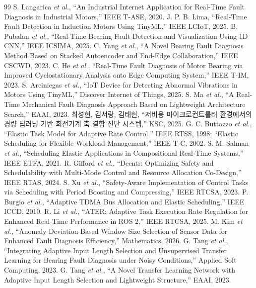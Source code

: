 \documentclass[10pt]{article}
\begin{document}
\begin{thebibliography}{99}\footnotesize
{} S. Langarica \emph{et al.}, ``An Industrial Internet Application for Real-Time Fault Diagnosis in Industrial Motors,'' IEEE T-ASE, 2020.
 J. P. B. Lima, ``Real-Time Fault Detection in Induction Motors Using TinyML,'' IEEE LCIoT, 2025.
 B. Pubalan \emph{et al.}, ``Real-Time Bearing Fault Detection and Visualization Using 1D CNN,'' IEEE ICSIMA, 2025.
 C. Yang \emph{et al.}, ``A Novel Bearing Fault Diagnosis Method Based on Stacked Autoencoder and End-Edge Collaboration,'' IEEE CSCWD, 2023.
 C. He \emph{et al.}, ``Real-Time Fault Diagnosis of Motor Bearing via Improved Cyclostationary Analysis onto Edge Computing System,'' IEEE T-IM, 2023.
 S. Arciniegas \emph{et al.}, ``IoT Device for Detecting Abnormal Vibrations in Motors Using TinyML,'' Discover Internet of Things, 2025.
 S. Ma \emph{et al.}, ``A Real-Time Mechanical Fault Diagnosis Approach Based on Lightweight Architecture Search,'' EAAI, 2023.
 최성현, 김서랑, 김태현, ``저비용 마이크로컨트롤러 환경에서의 경량 딥러닝 기반 회전기계 축 결함 진단 시스템,'' KSC, 2025.
 G. C. Buttazzo \emph{et al.}, ``Elastic Task Model for Adaptive Rate Control,'' IEEE RTSS, 1998; ``Elastic Scheduling for Flexible Workload Management,'' IEEE T-C, 2002.
 S. M. Salman \emph{et al.}, ``Scheduling Elastic Applications in Compositional Real-Time Systems,'' IEEE ETFA, 2021.
 R. Gifford \emph{et al.}, ``Decntr: Optimizing Safety and Schedulability with Multi-Mode Control and Resource Allocation Co-Design,'' IEEE RTAS, 2024.
 S. Xu \emph{et al.}, ``Safety-Aware Implementation of Control Tasks via Scheduling with Period Boosting and Compressing,'' IEEE RTCSA, 2023.
 P. Burgio \emph{et al.}, ``Adaptive TDMA Bus Allocation and Elastic Scheduling,'' IEEE ICCD, 2010.
 R. Li \emph{et al.}, ``ATER: Adaptive Task Execution Rate Regulation for Enhanced Real-Time Performance in ROS 2,'' IEEE RTCSA, 2025.
 M. Kim \emph{et al.}, ``Anomaly Deviation-Based Window Size Selection of Sensor Data for Enhanced Fault Diagnosis Efficiency,'' Mathematics, 2026.
 G. Tang \emph{et al.}, ``Integrating Adaptive Input Length Selection and Unsupervised Transfer Learning for Bearing Fault Diagnosis under Noisy Conditions,'' Applied Soft Computing, 2023.
 G. Tang \emph{et al.}, ``A Novel Transfer Learning Network with Adaptive Input Length Selection and Lightweight Structure,'' EAAI, 2023.

\end{thebibliography}
\end{document}
